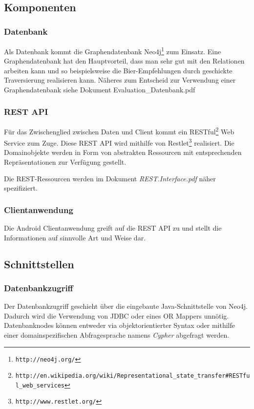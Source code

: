 \documentclass[10pt,a4paper]{scrartcl}
\begin{document}
\subsection{Komponenten}

\subsubsection{Datenbank}

Als Datenbank kommt die Graphendatenbank Neo4j\footnote{\texttt{http://neo4j.org/}} zum Einsatz.
Eine Graphendatenbank hat den Hauptvorteil, dass man sehr gut mit den Relationen arbeiten kann und
so beispielsweise die Bier-Empfehlungen durch geschickte Traversierung realisieren kann. Näheres zum Entscheid zur Verwendung einer Graphendatenbank siehe Dokument Evaluation_Datenbank.pdf

\subsubsection{REST API}

Für das Zwischenglied zwischen Daten und Client kommt ein
RESTful\footnote{\texttt{http://en.wikipedia.org/wiki/Representational\_state\_transfer\#RESTful\_web\_services}}
Web Service zum Zuge. Diese REST API wird mithilfe von
Restlet\footnote{\texttt{http://www.restlet.org/}} realisiert. Die Domainobjekte werden in Form von
abstrakten Ressourcen mit entsprechenden Repräsentationen zur Verfügung gestellt.

Die REST-Ressourcen werden im Dokument \textit{REST.Interface.pdf} näher spezifiziert.

\subsubsection{Clientanwendung}

Die Android Clientanwendung greift auf die REST API zu und stellt die Informationen auf sinnvolle
Art und Weise dar.


\subsection{Schnittstellen}

\subsubsection{Datenbankzugriff}

Der Datenbankzugriff geschieht über die eingebaute Java-Schnittstelle von Neo4j. Dadurch wird die
Verwendung von JDBC oder eines OR Mappers unnötig. Datenbanknodes können entweder via
objektorientierter Syntax oder mithilfe einer domainspezifischen Abfragesprache namens
\textit{Cypher} abgefragt werden.
\end{document}
